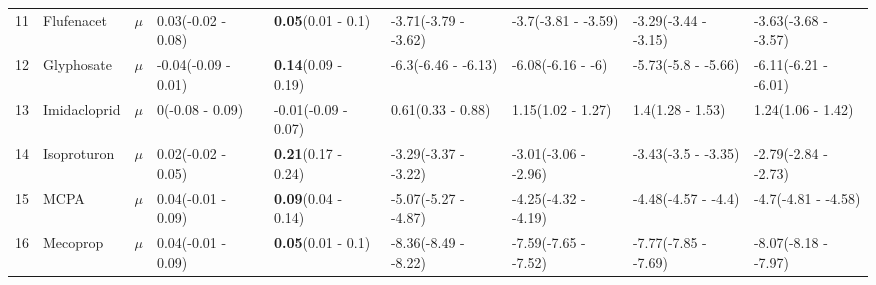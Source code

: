 \begin{landscape}
\begin{longtable}{lp{2cm}p{0.6cm}p{1.8cm}p{1.8cm}p{1.8cm}p{1.8cm}p{1.8cm}p{1.8cm}}
  11 & Flufenacet & $\mu$ & 0.03\newline (-0.02 - 0.08) & \textbf{0.05}\newline (0.01 - 0.1) & -3.71\newline (-3.79 - -3.62) & -3.7\newline (-3.81 - -3.59) & -3.29\newline (-3.44 - -3.15) & -3.63\newline (-3.68 - -3.57) \\ 
  12 & Glyphosate & $\mu$ & -0.04\newline (-0.09 - 0.01) & \textbf{0.14}\newline (0.09 - 0.19) & -6.3\newline (-6.46 - -6.13) & -6.08\newline (-6.16 - -6) & -5.73\newline (-5.8 - -5.66) & -6.11\newline (-6.21 - -6.01) \\ 
  13 & Imidacloprid & $\mu$ & 0\newline (-0.08 - 0.09) & -0.01\newline (-0.09 - 0.07) & 0.61\newline (0.33 - 0.88) & 1.15\newline (1.02 - 1.27) & 1.4\newline (1.28 - 1.53) & 1.24\newline (1.06 - 1.42) \\ 
  14 & Isoproturon & $\mu$ & 0.02\newline (-0.02 - 0.05) & \textbf{0.21}\newline (0.17 - 0.24) & -3.29\newline (-3.37 - -3.22) & -3.01\newline (-3.06 - -2.96) & -3.43\newline (-3.5 - -3.35) & -2.79\newline (-2.84 - -2.73) \\ 
  15 & MCPA & $\mu$ & 0.04\newline (-0.01 - 0.09) & \textbf{0.09}\newline (0.04 - 0.14) & -5.07\newline (-5.27 - -4.87) & -4.25\newline (-4.32 - -4.19) & -4.48\newline (-4.57 - -4.4) & -4.7\newline (-4.81 - -4.58) \\ 
  16 & Mecoprop & $\mu$ & 0.04\newline (-0.01 - 0.09) & \textbf{0.05}\newline (0.01 - 0.1) & -8.36\newline (-8.49 - -8.22) & -7.59\newline (-7.65 - -7.52) & -7.77\newline (-7.85 - -7.69) & -8.07\newline (-8.18 - -7.97) \\ 

\end{longtable}
\end{landscape}
